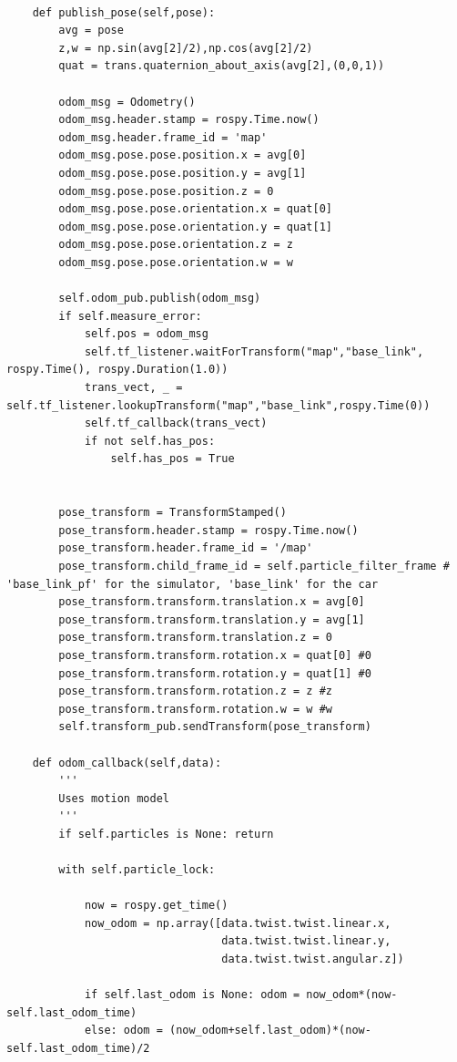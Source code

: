 \documentclass{article}
\begin{document}
{\begin{verbatim}
    
    def publish_pose(self,pose):
        avg = pose
        z,w = np.sin(avg[2]/2),np.cos(avg[2]/2)
        quat = trans.quaternion_about_axis(avg[2],(0,0,1))
        
        odom_msg = Odometry()
        odom_msg.header.stamp = rospy.Time.now()
        odom_msg.header.frame_id = 'map'
        odom_msg.pose.pose.position.x = avg[0]
        odom_msg.pose.pose.position.y = avg[1]
        odom_msg.pose.pose.position.z = 0
        odom_msg.pose.pose.orientation.x = quat[0]
        odom_msg.pose.pose.orientation.y = quat[1]
        odom_msg.pose.pose.orientation.z = z
        odom_msg.pose.pose.orientation.w = w
        
        self.odom_pub.publish(odom_msg)
        if self.measure_error:
            self.pos = odom_msg
            self.tf_listener.waitForTransform("map","base_link", rospy.Time(), rospy.Duration(1.0))
            trans_vect, _ = self.tf_listener.lookupTransform("map","base_link",rospy.Time(0))
            self.tf_callback(trans_vect)
            if not self.has_pos:
                self.has_pos = True


        pose_transform = TransformStamped()
        pose_transform.header.stamp = rospy.Time.now()
        pose_transform.header.frame_id = '/map'
        pose_transform.child_frame_id = self.particle_filter_frame # 'base_link_pf' for the simulator, 'base_link' for the car
        pose_transform.transform.translation.x = avg[0]
        pose_transform.transform.translation.y = avg[1]
        pose_transform.transform.translation.z = 0
        pose_transform.transform.rotation.x = quat[0] #0
        pose_transform.transform.rotation.y = quat[1] #0
        pose_transform.transform.rotation.z = z #z
        pose_transform.transform.rotation.w = w #w
        self.transform_pub.sendTransform(pose_transform)
    
    def odom_callback(self,data):
        '''
        Uses motion model
        '''
        if self.particles is None: return
        
        with self.particle_lock:

            now = rospy.get_time()
            now_odom = np.array([data.twist.twist.linear.x,
                                 data.twist.twist.linear.y,
                                 data.twist.twist.angular.z])
            
            if self.last_odom is None: odom = now_odom*(now-self.last_odom_time)
            else: odom = (now_odom+self.last_odom)*(now-self.last_odom_time)/2
            

\end{verbatim}}
\end{document}

